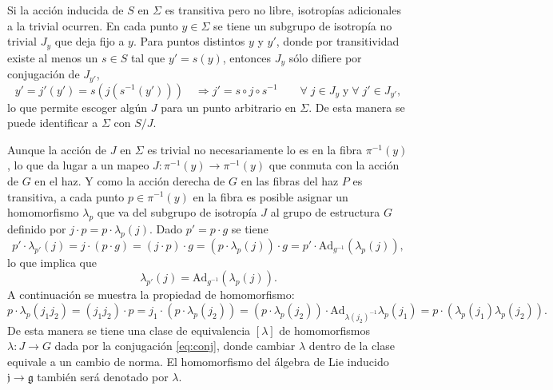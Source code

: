 Si la acci\'{o}n inducida de $S$ en $\Sigma$ es transitiva pero no libre, isotrop\'{i}as adicionales a la trivial ocurren. En cada punto $y \in \Sigma$ se tiene un subgrupo de isotrop\'{i}a no trivial $J_{y}$ que deja fijo a $y$. Para puntos distintos $y$ y $y'$, donde por transitividad existe al menos un $s \in S$ tal que $y' = s(y)$, entonces $J_{y}$ s\'{o}lo difiere por conjugaci\'{o}n de $J_{y'}$,
%
\begin{equation*}
y' = j'(y') = s ( j ( s^{-1} (y') ) )  \quad \Longrightarrow j' = s \circ j \circ s^{-1} \qquad \forall \; j \in J_{y} \; \mathrm{y} \; \forall \; j' \in J_{y'},
\end{equation*}
%
lo que permite escoger alg\'{u}n $J$ para un punto arbitrario en $\Sigma$. De esta manera se puede identificar a $\Sigma$ con $S/J$.

Aunque la acci\'{o}n de $J$ en $\Sigma$ es trivial no necesariamente lo es en la fibra $\pi^{-1} (y)$, lo que da lugar a un mapeo $J: \pi^{-1} (y) \longrightarrow \pi^{-1} (y)$ que conmuta con la acci\'{o}n de $G$ en el haz. Y como la acci\'{o}n derecha de $G$ en las fibras del haz $P$ es transitiva, a cada punto $p \in \pi^{-1}(y)$ en la fibra es posible asignar un homomorfismo $\lambda_{p}$ que va del subgrupo de isotrop\'{i}a $J$ al grupo de estructura $G$ definido por $j \cdot p = p \cdot \lambda_{p} (j)$. Dado $p' = p \cdot g$ se tiene
%
\begin{equation*}
p' \cdot \lambda_{p'} (j) = j \cdot (p \cdot g) = (j \cdot p) \cdot g = (p \cdot \lambda_{p} (j)) \cdot g = p' \cdot \mathrm{Ad}_{g^{-1}} (\lambda_{p} (j)),
\end{equation*}
%
lo que implica que
%
\begin{equation}
\label{eq:conj}
\lambda_{p'} (j) = \mathrm{Ad}_{g^{-1}} (\lambda_{p} (j)).
\end{equation}
%
A continuaci\'{o}n se muestra la propiedad de homomorfismo:
%
\begin{equation*}
p \cdot \lambda_{p} (j_{1} j_{2}) = (j_{1} j_{2}) \cdot p = j_{1} \cdot (p \cdot \lambda_{p} (j_{2})) = (p \cdot \lambda_{p} (j_{2})) \cdot \mathrm{Ad}_{\lambda(j_{2})^{-1}} \lambda_{p} (j_{1}) = p \cdot (\lambda_{p} (j_{1}) \lambda_{p} (j_{2})).
\end{equation*}
%
De esta manera se tiene una clase de equivalencia $[\lambda]$ de homomorfismos $\lambda: J \longrightarrow G$ dada por la conjugaci\'{o}n \eqref{eq:conj}, donde cambiar $\lambda$ dentro de la clase equivale a un cambio de norma. El homomorfismo del \'{a}lgebra de Lie inducido $\mathfrak{j} \longrightarrow \mathfrak{g}$ tambi\'{e}n ser\'{a} denotado por $\lambda$.

